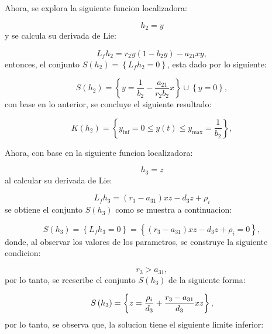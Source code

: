 \documentclass[letterpaper,11pt]{article}
\begin{document}
\bigskip

Ahora, se explora la siguiente funcion localizadora:

\begin{equation*}
h_{2}=y
\end{equation*}%
y se calcula su derivada de Lie:

\begin{equation*}
L_{f}h_{2}=r_{2}y(1-b_{2}y)-a_{21}xy,
\end{equation*}%
entonces, el conjunto $S\left( h_{2}\right) =\left\{ L_{f}h_{2}=0\right\} $,
esta dado por lo siguiente:

\begin{equation*}
S(h_{2})=\left\{ y=\frac{1}{b_{2}}-\frac{a_{21}}{r_{2}b_{2}}x\right\} \cup
\left\{ y=0\right\} ,
\end{equation*}%
con base en lo anterior, se concluye el siguiente resultado:

\begin{equation*}
K\left( h_{2}\right) =\left\{ y_{\inf }=0\leq y\left( t\right) \leq y_{\max
}=\frac{1}{b_{2}}\right\} ,
\end{equation*}

Ahora, con base en la siguiente funcion localizadora:

\begin{equation*}
h_{3}=z
\end{equation*}%
al calcular su derivada de Lie:

\begin{equation*}
L_{f}h_{3}=(r_{3}-a_{31})xz-d_{3}z+\rho _{i}
\end{equation*}%
se obtiene el conjunto $S\left( h_{3}\right) $ como se muestra a
continuacion:

\begin{equation*}
S\left( h_{3}\right) =\left\{ L_{f}h_{3}=0\right\} =\left\{ \left(
r_{3}-a_{31}\right) xz-d_{3}z+\rho _{i}=0\right\} ,
\end{equation*}%
donde, al observar los valores de los parametros, se construye la siguiente
condicion:

\begin{equation*}
r_{3}>a_{31},
\end{equation*}%
por lo tanto, se reescribe el conjunto $S\left( h_{3}\right) $ de la
siguiente forma:

\begin{equation*}
S\left( h_{3}\right) =\left\{ z=\frac{\rho _{i}}{d_{3}}+\frac{r_{3}-a_{31}}{%
d_{3}}xz\right\} ,
\end{equation*}%
por lo tanto, se observa que, la solucion tiene el siguiente limite inferior:
\end{document}
